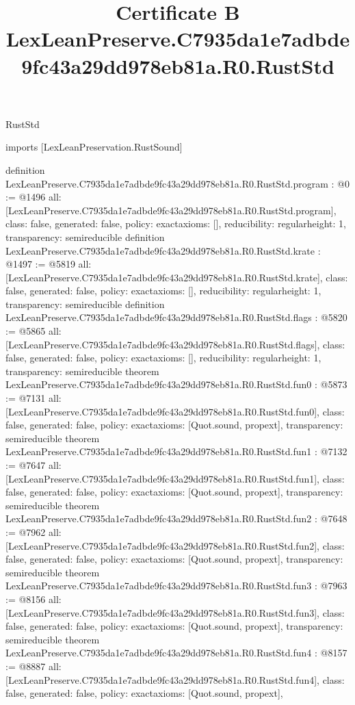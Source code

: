 \begin{lexlean}{RustStd}
\title{Certificate B LexLeanPreserve.C7935da1e7adbde9fc43a29dd978eb81a.R0.RustStd}
\begin{coremodule}
imports [LexLeanPreservation.RustSound]

definition LexLeanPreserve.C7935da1e7adbde9fc43a29dd978eb81a.R0.RustStd.program : @0 := @1496 {
  all: [LexLeanPreserve.C7935da1e7adbde9fc43a29dd978eb81a.R0.RustStd.program],
  class: false,
  generated: false,
  policy: exact{axioms: []},
  reducibility: regular{height: 1},
  transparency: semireducible
}
definition LexLeanPreserve.C7935da1e7adbde9fc43a29dd978eb81a.R0.RustStd.krate : @1497 := @5819 {
  all: [LexLeanPreserve.C7935da1e7adbde9fc43a29dd978eb81a.R0.RustStd.krate],
  class: false,
  generated: false,
  policy: exact{axioms: []},
  reducibility: regular{height: 1},
  transparency: semireducible
}
definition LexLeanPreserve.C7935da1e7adbde9fc43a29dd978eb81a.R0.RustStd.flags : @5820 := @5865 {
  all: [LexLeanPreserve.C7935da1e7adbde9fc43a29dd978eb81a.R0.RustStd.flags],
  class: false,
  generated: false,
  policy: exact{axioms: []},
  reducibility: regular{height: 1},
  transparency: semireducible
}
theorem LexLeanPreserve.C7935da1e7adbde9fc43a29dd978eb81a.R0.RustStd.fun0 : @5873 := @7131 {
  all: [LexLeanPreserve.C7935da1e7adbde9fc43a29dd978eb81a.R0.RustStd.fun0],
  class: false,
  generated: false,
  policy: exact{axioms: [Quot.sound, propext]},
  transparency: semireducible
}
theorem LexLeanPreserve.C7935da1e7adbde9fc43a29dd978eb81a.R0.RustStd.fun1 : @7132 := @7647 {
  all: [LexLeanPreserve.C7935da1e7adbde9fc43a29dd978eb81a.R0.RustStd.fun1],
  class: false,
  generated: false,
  policy: exact{axioms: [Quot.sound, propext]},
  transparency: semireducible
}
theorem LexLeanPreserve.C7935da1e7adbde9fc43a29dd978eb81a.R0.RustStd.fun2 : @7648 := @7962 {
  all: [LexLeanPreserve.C7935da1e7adbde9fc43a29dd978eb81a.R0.RustStd.fun2],
  class: false,
  generated: false,
  policy: exact{axioms: [Quot.sound, propext]},
  transparency: semireducible
}
theorem LexLeanPreserve.C7935da1e7adbde9fc43a29dd978eb81a.R0.RustStd.fun3 : @7963 := @8156 {
  all: [LexLeanPreserve.C7935da1e7adbde9fc43a29dd978eb81a.R0.RustStd.fun3],
  class: false,
  generated: false,
  policy: exact{axioms: [Quot.sound, propext]},
  transparency: semireducible
}
theorem LexLeanPreserve.C7935da1e7adbde9fc43a29dd978eb81a.R0.RustStd.fun4 : @8157 := @8887 {
  all: [LexLeanPreserve.C7935da1e7adbde9fc43a29dd978eb81a.R0.RustStd.fun4],
  class: false,
  generated: false,
  policy: exact{axioms: [Quot.sound, propext]},
}
\end{coremodule}
\end{lexlean}
